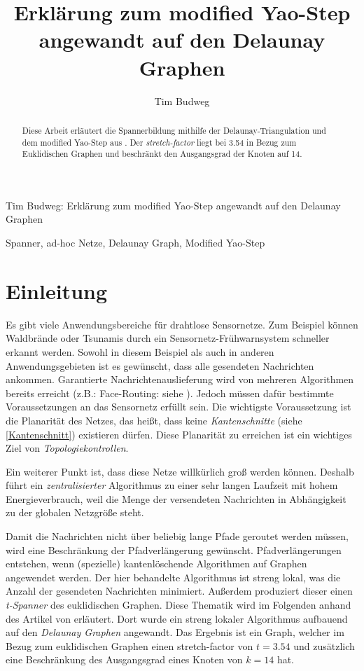 \documentclass[a4paper,twoside]{IEEEtran}
\newcommand{\seminarteilnehmer}{Tim Budweg}
\newcommand{\seminartitel}{Erklärung zum modified Yao-Step angewandt auf den Delaunay Graphen}
\begin{document}
\title{\seminartitel}
\author{\seminarteilnehmer}

%
{\seminarteilnehmer: \seminartitel}


\maketitle

\begin{abstract}
\space Diese Arbeit erläutert die Spannerbildung mithilfe der Delaunay-Triangulation und dem modified Yao-Step aus \cite{kanj}. Der \emph{stretch-factor} liegt bei 3.54 in Bezug zum Euklidischen Graphen und beschränkt den Ausgangsgrad der Knoten auf 14.
\end{abstract}

\begin{IEEEkeywords}
\space Spanner, ad-hoc Netze, Delaunay Graph, Modified Yao-Step
\end{IEEEkeywords}


\section{Einleitung}
Es gibt viele Anwendungsbereiche für drahtlose Sensornetze. 
Zum Beispiel können Waldbrände oder Tsunamis durch ein Sensornetz-Frühwarnsystem schneller erkannt werden. 
Sowohl in diesem Beispiel als auch in anderen Anwendungsgebieten ist es gewünscht, dass alle gesendeten Nachrichten ankommen.
Garantierte Nachrichtenauslieferung wird von mehreren Algorithmen bereits erreicht (z.B.: Face-Routing: siehe \cite{FaceRouting}).
Jedoch müssen dafür bestimmte Voraussetzungen an das Sensornetz erfüllt sein. 
Die wichtigste Voraussetzung ist die Planarität des Netzes, das heißt, dass keine \emph{Kantenschnitte} (siehe \ref{Kantenschnitt}) existieren dürfen. 
Diese Planarität zu erreichen ist ein wichtiges Ziel von \emph{Topologiekontrollen}.

Ein weiterer Punkt ist, dass diese Netze willkürlich groß werden können.
Deshalb führt ein \emph{zentralisierter} Algorithmus zu einer sehr langen Laufzeit mit hohem Energieverbrauch, weil die Menge der versendeten Nachrichten in Abhängigkeit zu der globalen Netzgröße steht.

Damit die Nachrichten nicht über beliebig lange Pfade geroutet werden müssen, wird eine Beschränkung der Pfadverlängerung gewünscht. 
Pfadverlängerungen entstehen, wenn (spezielle) kantenlöschende Algorithmen auf Graphen angewendet werden.
Der hier behandelte Algorithmus ist streng lokal, was die Anzahl der gesendeten Nachrichten minimiert.
Außerdem produziert dieser einen \emph{t-Spanner} des euklidischen Graphen.
Diese Thematik wird im Folgenden anhand des Artikel von \cite{kanj} erläutert.
Dort wurde ein streng lokaler Algorithmus aufbauend auf den \emph{Delaunay Graphen} angewandt.
Das Ergebnis ist ein Graph, welcher im Bezug zum euklidischen Graphen einen stretch-factor von $t=3.54 $ und zusätzlich eine Beschränkung des Ausgangsgrad eines Knoten von $k=14 $ hat. %
\end{document}
